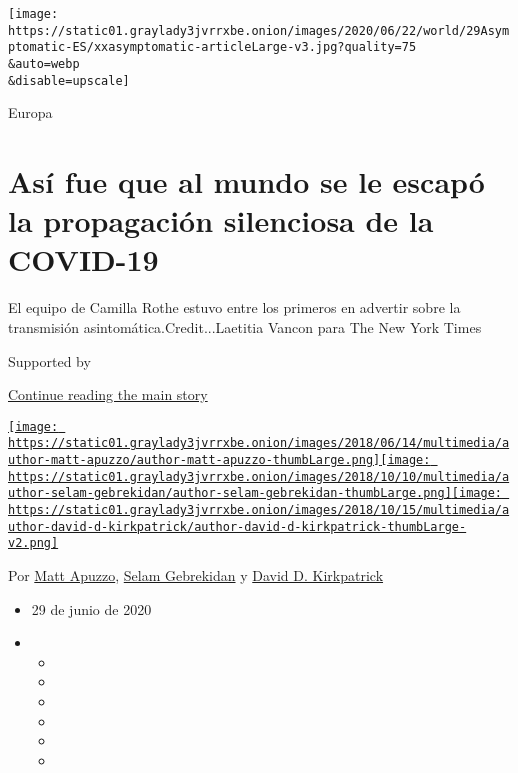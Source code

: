 \texttt{[image: https://static01.graylady3jvrrxbe.onion/images/2020/06/22/world/29Asymptomatic-ES/xxasymptomatic-articleLarge-v3.jpg?quality=75\\\&auto=webp\\\&disable=upscale]}

Europa

\hypertarget{asuxed-fue-que-al-mundo-se-le-escapuxf3-la-propagaciuxf3n-silenciosa-de-la-covid-19}{%
\section{Así fue que al mundo se le escapó la propagación silenciosa de
la
COVID-19}\label{asuxed-fue-que-al-mundo-se-le-escapuxf3-la-propagaciuxf3n-silenciosa-de-la-covid-19}}

El equipo de Camilla Rothe estuvo entre los primeros en advertir sobre
la transmisión asintomática.Credit...Laetitia Vancon para The New York
Times

Supported by

\protect\hyperlink{after-sponsor}{Continue reading the main story}

\href{https://www.nytimes3xbfgragh.onion/by/matt-apuzzo}{\texttt{[image: https://static01.graylady3jvrrxbe.onion/images/2018/06/14/multimedia/author-matt-apuzzo/author-matt-apuzzo-thumbLarge.png]}}\href{https://www.nytimes3xbfgragh.onion/by/selam-gebrekidan}{\texttt{[image: https://static01.graylady3jvrrxbe.onion/images/2018/10/10/multimedia/author-selam-gebrekidan/author-selam-gebrekidan-thumbLarge.png]}}\href{https://www.nytimes3xbfgragh.onion/by/david-d-kirkpatrick}{\texttt{[image: https://static01.graylady3jvrrxbe.onion/images/2018/10/15/multimedia/author-david-d-kirkpatrick/author-david-d-kirkpatrick-thumbLarge-v2.png]}}

Por \href{https://www.nytimes3xbfgragh.onion/by/matt-apuzzo}{Matt
Apuzzo},
\href{https://www.nytimes3xbfgragh.onion/by/selam-gebrekidan}{Selam
Gebrekidan} y
\href{https://www.nytimes3xbfgragh.onion/by/david-d-kirkpatrick}{David
D. Kirkpatrick}

\begin{itemize}
\item
  29 de junio de 2020
\item
  \begin{itemize}
  \item
  \item
  \item
  \item
  \item
  \item
  \end{itemize}
\end{itemize}

